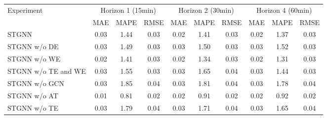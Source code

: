 \begin{tabular}{lccccccccc}
\toprule
Experiment & \multicolumn{3}{c}{Horizon 1 (15min)} & \multicolumn{3}{c}{Horizon 2 (30min)} & \multicolumn{3}{c}{Horizon 4 (60min)} \\
 & MAE & MAPE & RMSE & MAE & MAPE & RMSE & MAE & MAPE & RMSE \\
\midrule
STGNN & 0.03 & 1.44 & 0.03 & 0.02 & 1.41 & 0.03 & 0.02 & 1.37 & 0.03 \\
STGNN w/o DE & 0.03 & 1.49 & 0.03 & 0.03 & 1.50 & 0.03 & 0.03 & 1.52 & 0.03 \\
STGNN w/o WE & 0.02 & 1.41 & 0.03 & 0.02 & 1.34 & 0.03 & 0.02 & 1.31 & 0.03 \\
STGNN w/o TE and WE & 0.03 & 1.55 & 0.03 & 0.03 & 1.65 & 0.04 & 0.03 & 1.44 & 0.03 \\
STGNN w/o GCN & 0.03 & 1.85 & 0.04 & 0.03 & 1.81 & 0.04 & 0.03 & 1.78 & 0.04 \\
STGNN w/o AT & 0.01 & 0.81 & 0.02 & 0.02 & 0.91 & 0.02 & 0.02 & 0.92 & 0.02 \\
STGNN w/o TE & 0.03 & 1.79 & 0.04 & 0.03 & 1.71 & 0.04 & 0.03 & 1.65 & 0.04 \\
\bottomrule
\end{tabular}
